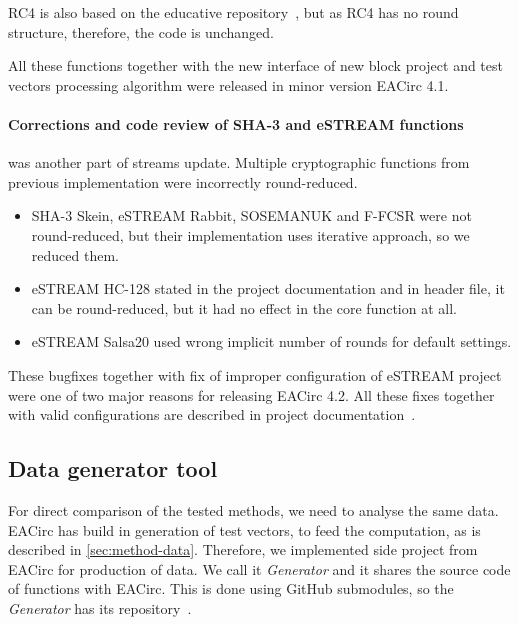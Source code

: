 \documentclass[
  print, %
  Table,   %
  nolof,     %
  nolot,     %
  11pt, %
  oneside  %
]{fithesis3}
\begin{document}
RC4 is also based on the educative repository~\cite{cryptoFunc}, but as RC4 has no round structure, therefore, the code is unchanged.

All these functions together with the new interface of new block project and test vectors processing algorithm were released in minor version EACirc 4.1.

\paragraph{Corrections and code review of SHA-3 and eSTREAM functions} was another part of streams update. Multiple cryptographic functions from previous implementation were incorrectly round-reduced.
\label{par:method-data-funcs-bugs}

\begin{itemize}
    \item SHA-3 Skein, eSTREAM Rabbit, SOSEMANUK and F-FCSR were not round-reduced, but their implementation uses iterative approach, so we reduced them.
    \item eSTREAM HC-128 stated in the project documentation and in header file, it can be round-reduced, but it had no effect in the core function at all.
    \item eSTREAM Salsa20 used wrong implicit number of rounds for default settings.
\end{itemize}

These bugfixes together with fix of improper configuration of eSTREAM project were one of two major reasons for releasing EACirc 4.2. All these fixes together with valid configurations are described in project documentation~\cite{EACirc-wiki-streams}.

\subsection{Data generator tool}
\label{subsec:method-data-generator}

For direct comparison of the tested methods, we need to analyse the same data. EACirc has build in generation of test vectors, to feed the computation, as is described in \cref{sec:method-data}. Therefore, we implemented side project from EACirc for production of data. We call it \textit{Generator} and it shares the source code of functions with EACirc. This is done using GitHub submodules, so the \textit{Generator} has its repository~\cite{EACircStreams}.
\end{document}
